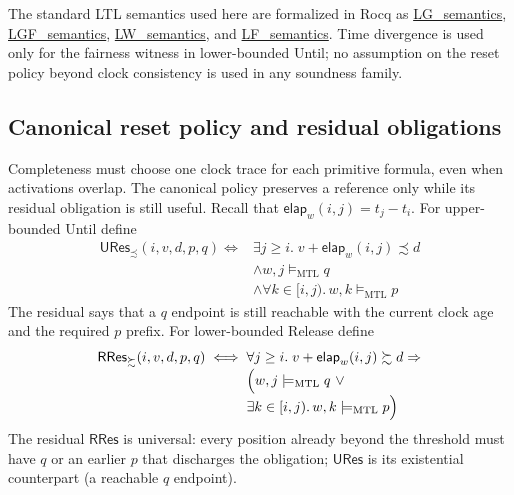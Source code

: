 \documentclass{ieeeaccess}
\newcommand{\satM}{\models_{\mathrm{MTL}}}
\newcommand{\elapsed}{\mathsf{elap}}
\newcommand{\Rocqid}[1]{\url{#1}}
\begin{document}
The standard LTL semantics used here are formalized in Rocq as
\Rocqid{LG_semantics}, \Rocqid{LGF_semantics},
\Rocqid{LW_semantics}, and \Rocqid{LF_semantics}. Time divergence is used
only for the fairness witness in lower-bounded Until; no assumption on the
reset policy beyond clock consistency is used in any soundness family.

\subsection{Canonical reset policy and residual obligations}
\label{subsec:canonical-policy}
Completeness must choose one clock trace for each primitive formula, even
when activations overlap. The canonical policy preserves a reference only
while its residual obligation is still useful. Recall that
$\elapsed_w(i,j)=t_j-t_i$. For upper-bounded Until define
\begin{align}
\mathsf{URes}_{\precsim}(i,v,d,p,q)\iff{}
&\exists j\ge i.\;v+\elapsed_w(i,j)\precsim d\nonumber\\[-1mm]
&\land w,j\satM q\nonumber\\[-1mm]
&\land\forall k\in[i,j).\,w,k\satM p\label{eq:ures-le}
\end{align}
The residual says that a $q$ endpoint is still reachable with the current
clock age and the required $p$ prefix. For lower-bounded Release define
\begin{align}
\mathsf{RRes}_{\succsim}(i,v,d,p,q)\iff{}
&\forall j\ge i.\;v+\elapsed_w(i,j)\succsim d\Rightarrow\nonumber\\[-1mm]
&\Bigl(w,j\satM q~\lor\nonumber\\[-1mm]
&\exists k\in[i,j).\,w,k\satM p\Bigr)\label{eq:rres-ge}
\end{align}
The residual $\mathsf{RRes}$ is universal: every position already beyond the
threshold must have $q$ or an earlier $p$ that discharges the obligation;
$\mathsf{URes}$ is its existential counterpart (a reachable $q$ endpoint).
\end{document}
